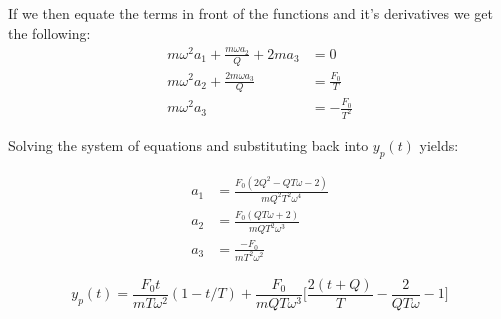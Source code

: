 If we then equate the terms in front of the functions and it's derivatives we get the following:\\
\begin{align*}
    m\omega^2 a_1 + \frac{m \omega a_2}{Q} + 2ma_3 &= 0\\
    m \omega^2 a_2 + \frac{2m\omega a_3}{Q} &= \frac{F_0}{T}\\
    m \omega^2 a_3 &= -\frac{F_0}{T^2}
\end{align*}

Solving the system of equations and substituting back into $y_p(t)$ yields:

\begin{align*}
    a_1 &= \frac{F_0 ( 2Q^2 -Q T\omega -2)}{mQ^2 T^2 \omega^4}\\
    a_2 &= \frac{F_0 ( QT\omega +2)}{mQT^2\omega^3}\\
    a_3 &= \frac{-F_0}{mT^2 \omega^2}
\end{align*}

\begin{equation}
    y_p(t)=\frac{F_0 t}{mT\omega^2}(1-t/T)+\frac{F_0}{mQT\omega^3}\biggl[\frac{2(t+Q)}{T}-\frac{2}{QT\omega}-1\biggr]
\end{equation}
\clearpage






